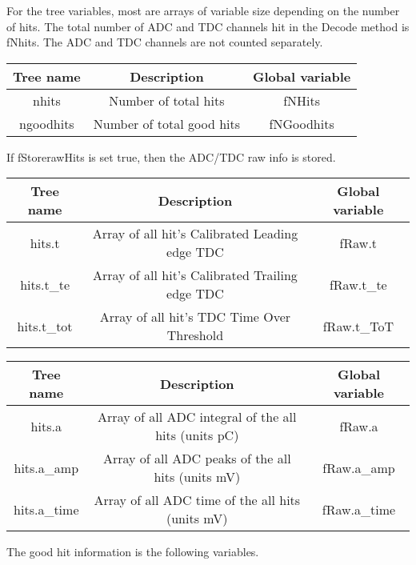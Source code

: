 \documentclass[11pt]{article}
\begin{document}
For the tree variables, most are arrays of variable size depending on the number of hits. 
The total number of  ADC and TDC channels hit in the Decode method is fNhits. The ADC and TDC channels
are not counted separately.
\begin{center}
	\begin{tabular}{|c|c|c|}
		\hline 
		Tree name	& Description &  Global variable\\ 
		\hline 
		nhits	& Number of total hits & fNHits  \\ 
		\hline 
		ngoodhits	& Number of total good hits & fNGoodhits \\ 
		\hline 
\end{tabular} 
\end{center}

If fStorerawHits is set true, then the ADC/TDC raw info is stored.

\begin{center}
\begin{tabular}{|c|c|c|}
	\hline 
	Tree name	& Description &  Global variable\\ 
	\hline 
	hits.t 	& Array of all hit's Calibrated Leading edge TDC  &fRaw.t  \\ 
	\hline 
	hits.t\_te 	&Array of all hit's  Calibrated Trailing edge TDC &fRaw.t\_te  \\ 
	\hline 
	hits.t\_tot	&Array of  all hit's TDC Time Over Threshold   &fRaw.t\_ToT  \\ 
	\hline 
\end{tabular} 
\end{center}
\begin{center}
	\begin{tabular}{|c|c|c|}
		\hline 
		Tree name	& Description &  Global variable\\ 
		\hline 
		hits.a 	& Array of all ADC integral of the all hits  (units pC)  &fRaw.a  \\ 
		\hline 
		hits.a\_amp 	& Array of all ADC peaks of the all hits  (units mV)  &fRaw.a\_amp  \\ 
		\hline 
		hits.a\_time	& Array of all ADC time of the all hits (units mV)  &fRaw.a\_time  \\ 
		\hline 
	\end{tabular} 
\end{center}

The good hit information is the following variables.
\end{document}
